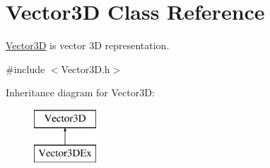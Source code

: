 \hypertarget{class_vector3_d}{
\section{\-Vector3\-D \-Class \-Reference}
\label{class_vector3_d}
}


\hyperlink{class_vector3_d}{\-Vector3\-D} is vector 3\-D representation.  




{\ttfamily \#include $<$\-Vector3\-D.\-h$>$}

\-Inheritance diagram for \-Vector3\-D\-:\begin{figure}[H]
\begin{center}
\leavevmode
\includegraphics[height=2.000000cm]{class_vector3_d}
\end{center}
\end{figure}
